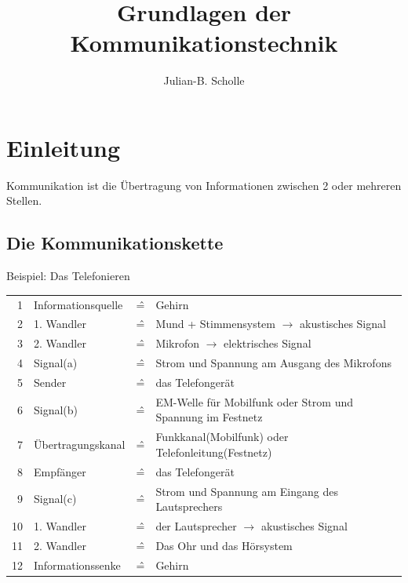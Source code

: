\documentclass[a4paper,10pt]{article}
\title{Grundlagen der Kommunikationstechnik}
\author{Julian-B. Scholle}
\begin{document}
\maketitle

\begin{abstract}

\end{abstract}

\section{Einleitung}

Kommunikation ist die Übertragung von Informationen zwischen 2 oder mehreren Stellen. 

\subsection{Die Kommunikationskette}
Beispiel: Das Telefonieren\\

\begin{tabularx}{\textwidth}{rlXl}
1   & Informationsquelle &  \^=  & Gehirn  \\ 
2   & 1. Wandler &  \^=  & Mund + Stimmensystem $\rightarrow$ akustisches Signal  \\ 
3   & 2. Wandler &  \^=  & Mikrofon $\rightarrow$ elektrisches Signal  \\ 
4   & Signal(a) &  \^=  & Strom und Spannung am Ausgang des Mikrofons  \\ 
5   & Sender &  \^=  & das Telefongerät  \\ 
6   & Signal(b) &  \^=  & EM-Welle für Mobilfunk oder Strom und Spannung im Festnetz  \\ 
7   & Übertragungskanal &  \^=  & Funkkanal(Mobilfunk) oder Telefonleitung(Festnetz)  \\ 
8   & Empfänger &  \^=  & das Telefongerät  \\ 
9   & Signal(c) &  \^=  & Strom und Spannung am Eingang des Lautsprechers  \\ 
10   & 1. Wandler &  \^=  & der Lautsprecher $\rightarrow$ akustisches Signal  \\ 
11   & 2. Wandler &  \^=  & Das Ohr und das Hörsystem  \\ 
12   & Informationssenke &  \^=  & Gehirn 
\end{tabularx}
\end{document}
